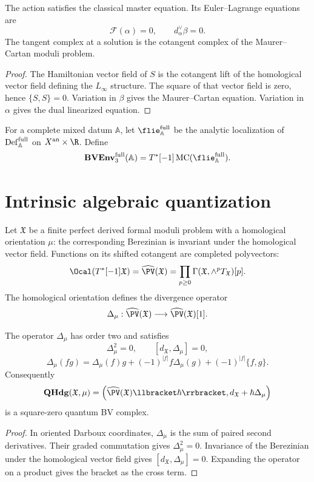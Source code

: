 \begin{theorem}
The action satisfies the classical master equation.  Its Euler--Lagrange equations are
\[
 \mathcal F(\alpha)=0,
 \qquad
 d_\alpha^\vee\beta=0.
\]
The tangent complex at a solution is the cotangent complex of the Maurer--Cartan moduli problem.
\end{theorem}
\begin{proof}
The Hamiltonian vector field of $S$ is the cotangent lift of the homological vector field defining the $L_\infty$ structure.  The square of that vector field is zero, hence $\{S,S\}=0$.  Variation in $\beta$ gives the Maurer--Cartan equation.  Variation in $\alpha$ gives the dual linearized equation.
\end{proof}

\begin{definition}
For a complete mixed datum $\mathbb A$, let $\flie_{\mathbb A}^{\mathrm{full}}$ be the analytic localization of $\operatorname{Def}_{\mathbb A}^{\mathrm{full}}$ on $X^{\mathrm{an}}\times\R$.  Define
\[
 \BVEnv_3^{\mathrm{full}}(\mathbb A)
 =T^*[-1]\MC(\flie_{\mathbb A}^{\mathrm{full}}).
\]
\end{definition}

\chapter{Intrinsic algebraic quantization}
Let $\mathfrak X$ be a finite perfect derived formal moduli problem with a homological orientation $\mu$: the corresponding Berezinian is invariant under the homological vector field.  Functions on its shifted cotangent are completed polyvectors:
\[
 \Ocal(T^*[-1]\mathfrak X)
 =\widehat{\PV}(\mathfrak X)
 =\prod_{p\ge0}\Gamma(\mathfrak X,\wedge^pT_{\mathfrak X})[p].
\]
The homological orientation defines the divergence operator
\[
 \Delta_\mu:\widehat{\PV}(\mathfrak X)
 \longrightarrow\widehat{\PV}(\mathfrak X)[1].
\]

\begin{theorem}
The operator $\Delta_\mu$ has order two and satisfies
\[
 \Delta_\mu^2=0,
 \qquad
 [d_{\mathfrak X},\Delta_\mu]=0,
\]
\[
 \Delta_\mu(fg)=\Delta_\mu(f)g+(-1)^{|f|}f\Delta_\mu(g)
 +(-1)^{|f|}\{f,g\}.
\]
Consequently
\[
 \QHdg(\mathfrak X,\mu)
 =\left(\widehat\PV(\mathfrak X)\llbracket\hbar\rrbracket,
 d_{\mathfrak X}+\hbar\Delta_\mu\right)
\]
is a square-zero quantum BV complex.
\end{theorem}
\begin{proof}
In oriented Darboux coordinates, $\Delta_\mu$ is the sum of paired second derivatives.  Their graded commutation gives $\Delta_\mu^2=0$.  Invariance of the Berezinian under the homological vector field gives $[d_{\mathfrak X},\Delta_\mu]=0$.  Expanding the operator on a product gives the bracket as the cross term.
\end{proof}

